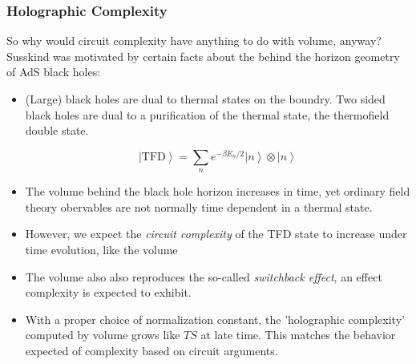 \documentclass[10pt,aspectratio=169]{beamer}
\newcommand{\ket}[1]{\left| #1 \right>}
\begin{document}
\begin{frame}
\frametitle{Holographic Complexity}

So why would circuit complexity have anything to do with volume, anyway? Susskind was motivated by certain facts about the behind the horizon geometry of AdS black holes:

\begin{itemize}

\item (Large) black holes are dual to thermal states on the boundry. Two sided black holes are dual to a purification of the thermal state, the thermofield double state. 

$$\ket{\text{TFD}} = \displaystyle\sum_n e^{- \beta E_n /2} \ket{n} \otimes \ket{n}$$

\item The volume behind the black hole horizon increases in time, yet ordinary field theory obervables are not normally time dependent in a thermal state.

\item However, we expect the {\it circuit complexity} of the TFD state to increase under time evolution, like the volume

\item The volume also also reproduces the so-called {\it switchback effect}, an effect complexity is expected to exhibit.

\item With a proper choice of normalization constant, the 'holographic complexity' computed by volume grows like $T S$ at late time. This matches the behavior expected of complexity based on circuit arguments. 

\end{itemize}

\end{frame}
\end{document}
